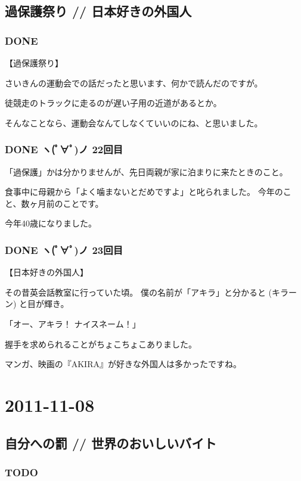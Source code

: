 \documentclass[11pt]{article}
\begin{document}
\subsection{過保護祭り // 日本好きの外国人}
\label{sec-41_1}
\subsubsection{\textbf{DONE}}
\label{sec-41_1_1}

【過保護祭り】

さいきんの運動会での話だったと思います、何かで読んだのですが。

徒競走のトラックに走るのが遅い子用の近道があるとか。

そんなことなら、運動会なんてしなくていいのにね、と思いました。
\subsubsection{\textbf{DONE} ヽ(ﾟ∀ﾟ)ノ 22回目}
\label{sec-41_1_2}

「過保護」かは分かりませんが、先日両親が家に泊まりに来たときのこと。

食事中に母親から「よく噛まないとだめですよ」と叱られました。
今年のこと、数ヶ月前のことです。

今年40歳になりました。
\subsubsection{\textbf{DONE} ヽ(ﾟ∀ﾟ)ノ 23回目}
\label{sec-41_1_3}

【日本好きの外国人】

その昔英会話教室に行っていた頃。
僕の名前が「アキラ」と分かると (キラーン) と目が輝き。

「オー、アキラ！ ナイスネーム！」

握手を求められることがちょこちょこありました。

マンガ、映画の『AKIRA』が好きな外国人は多かったですね。
\section{2011-11-08}
\label{sec-42}
\subsection{自分への罰 // 世界のおいしいバイト}
\label{sec-42_1}
\subsubsection{\textbf{TODO}}
\label{sec-42_1_1}
\end{document}
